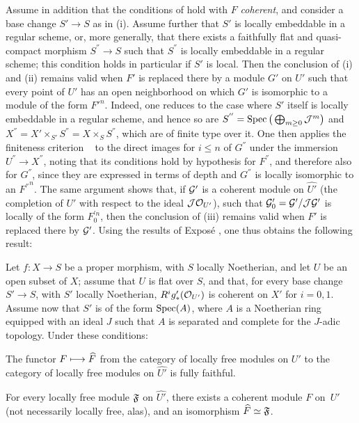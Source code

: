 \begin{remarque} \label{XII.5.9}
Assume in addition that the conditions of  hold with $F$ \emph{coherent}, and consider a base change $S'\to S$ as in  (i). Assume further that $S'$ is locally embeddable in a regular scheme, or, more generally, that there exists a faithfully flat and quasi-compact morphism $S^{''}\to S$ such that $S^{''}$ is locally embeddable in a regular scheme; this condition holds in particular if $S'$ is local. Then the conclusion of  (i) and (ii) remains valid when $F'$ is replaced there by a module $G'$ on $U'$ such that every point of $U'$ has an open neighborhood on which $G'$ is isomorphic to a module of the form ${F'}^n$. Indeed, one reduces to the case where $S'$ itself is locally embeddable in a regular scheme, and hence so are $S^{''}=\operatorname{Spec}\big(\bigoplus_{m\geq 0}\mathcal J^m\big)$ and $X^{''}=X'\times_{S'}S^{''}=X\times_SS^{''}$, which are of finite type over it. One then applies the finiteness criterion ~ to the direct images for $i\leq n$ of $G^{''}$ under the immersion $U^{''}\to X^{''}$, noting that its conditions hold by hypothesis for $F^{''}$\pageoriginaled, and therefore also for $G^{''}$, since they are expressed in terms of depth and $G^{''}$ is locally isomorphic to an ${F^{''}}^n$. The same argument shows that, if $\mathcal G'$ is a coherent module on $\widehat{U'}$ (the completion of $U'$ with respect to the ideal $\mathcal J\mathcal O_{U'}$), such that $\mathcal G'_0=\mathcal G'/\mathcal J\mathcal G'$ is locally of the form $F_0^{'n}$, then the conclusion of (iii) remains valid when $F'$ is replaced there by $\mathcal G'$. Using the results of Expos\'e , one thus obtains the following result:
\end{remarque}

\begin{corollaire} \label{XII.5.10}
Let $f:X\to S$ be a proper morphism, with $S$ locally Noetherian, and let $U$ be an open subset of $X$; assume that $U$ is flat over $S$, and that, for every base change $S'\to S$, with $S'$ locally Noetherian, $R^ig'_\ast(\mathcal O_{U'})$ is coherent on $X'$ for $i=0,1$. Assume now that $S'$ is of the form $\operatorname{Spec}(A)$, where $A$ is a Noetherian ring equipped with an ideal $J$ such that $A$ is separated and complete for the $J$-adic topology. Under these conditions:
\begin{enumeratei}
\item
The functor $F\longmapsto\widehat{F}$ from the category of locally free modules on $U'$ to the category of locally free modules on $\widehat{U'}$ is fully faithful.
\item
For every locally free module $\mathfrak F$ on $\widehat{U'}$, there exists a coherent module $F$ on~$U'$ (not necessarily locally free, alas), and an isomorphism $\widehat{F}\simeq\mathfrak F$.
\end{enumeratei}
\end{corollaire}

